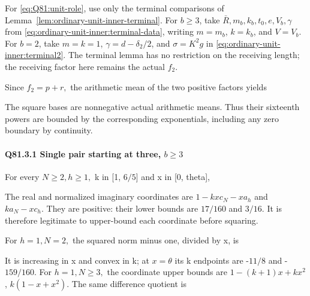 For \eqref{eq:Q81:unit-role}, use only the terminal comparisons of
Lemma~\ref{lem:ordinary-unit-inner-terminal}. For \(b\ge3\), take
\(\bar R,\allowbreak m_b,\allowbreak k_b,\allowbreak t_0,\allowbreak e,\allowbreak V_b,\allowbreak\gamma\) from
\eqref{eq:ordinary-unit-inner:terminal-data}, writing
\(m=m_b\), \(k=k_b\), and \(V=V_b\).
For \(b=2\), take \(m=k=1\), \(\gamma=d-\delta_2/2\), and
\(\sigma=K^2g\) in \eqref{eq:ordinary-unit-inner:terminal2}.
The terminal lemma has no restriction on the receiving length;
the receiving factor here remains the actual \(f_2\).

Since \(f_{2}=p+r,\allowbreak \) the arithmetic mean of the two positive factors yields


The square bases are nonnegative actual arithmetic means. Thus their
sixteenth powers are bounded by the corresponding exponentials,
including any zero boundary by continuity.

\paragraph{Q81.3.1 Single pair starting at three, \(b\ge 3\)}

For every \(N\ge 2,\allowbreak  h\ge 1,\allowbreak \) k in [1, \(6/5\)] and x in [0, theta],


The real and normalized imaginary coordinates are
\(1-kx c_N-xa_h\) and \(ka_N-xc_h\). They are positive:
their lower bounds are \(17/160\) and \(3/16.\) It is therefore legitimate
to upper-bound each coordinate before squaring.

For \(h=1,\allowbreak  N=2,\allowbreak \) the squared norm minus one, divided by x, is


It is increasing in x and convex in k; at \(x=\theta\) its k endpoints
are -\(11/8\) and -\(159/160.\)
For \(h=1,\allowbreak  N\ge 3,\allowbreak \) the coordinate upper bounds are
\(1-(k+1)x+kx^2\), \(k(1-x+x^2)\). The same difference quotient is


